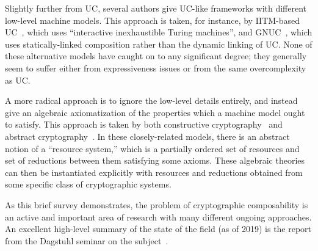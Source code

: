 Slightly further from UC, several authors give UC-like frameworks with different
low-level machine models. This approach is taken, for instance, by IITM-based
UC~\cite{camenisch-et-al-2019}, which uses ``interactive inexhaustible Turing
machines'', and GNUC~\cite{hofheinz-shoup-2011}, which uses statically-linked
composition rather than the dynamic linking of UC. None of these alternative
models have caught on to any significant degree; they generally seem to suffer
either from expressiveness issues or from the same overcomplexity as UC.

A more radical approach is to ignore the low-level details entirely, and
instead give an algebraic axiomatization of the properties which a machine model
ought to satisfy. This approach is taken by both constructive
cryptography~\cite{maurer-et-al-2012} and abstract
cryptography~\cite{maurer-renner-2011}.  In these closely-related models, there
is an abstract notion of a ``resource system,'' which is a partially ordered set
of resources and set of reductions between them satisfying some axioms. These
algebraic theories can then be instantiated explicitly with resources and
reductions obtained from some specific class of cryptographic systems.

As this brief survey demonstrates, the problem of cryptographic composability is
an active and important area of research with many different ongoing approaches.
An excellent high-level summary of the state of the field (as of 2019) is the
report from the Dagstuhl seminar on the subject~\cite{camenisch-et-al-2019}.
